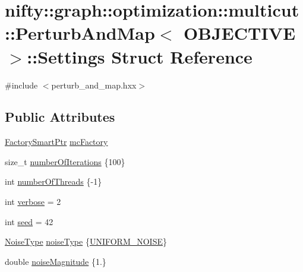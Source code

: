\hypertarget{structnifty_1_1graph_1_1optimization_1_1multicut_1_1PerturbAndMap_1_1Settings}{}\section{nifty\+:\+:graph\+:\+:optimization\+:\+:multicut\+:\+:Perturb\+And\+Map$<$ O\+B\+J\+E\+C\+T\+I\+V\+E $>$\+:\+:Settings Struct Reference}
\label{structnifty_1_1graph_1_1optimization_1_1multicut_1_1PerturbAndMap_1_1Settings}


{\ttfamily \#include $<$perturb\+\_\+and\+\_\+map.\+hxx$>$}

\subsection*{Public Attributes}
\begin{DoxyCompactItemize}
\item 
\hyperlink{classnifty_1_1graph_1_1optimization_1_1multicut_1_1PerturbAndMap_a71ef6212402b9a6fef9e6f29cd0ba658}{Factory\+Smart\+Ptr} \hyperlink{structnifty_1_1graph_1_1optimization_1_1multicut_1_1PerturbAndMap_1_1Settings_aff71bc878ba1c8c4c903b1c4b6ca5f61}{mc\+Factory}
\item 
size\+\_\+t \hyperlink{structnifty_1_1graph_1_1optimization_1_1multicut_1_1PerturbAndMap_1_1Settings_a6c962fe02ad14236a13fb7f3351a33f1}{number\+Of\+Iterations} \{100\}
\item 
int \hyperlink{structnifty_1_1graph_1_1optimization_1_1multicut_1_1PerturbAndMap_1_1Settings_a0c0cf8ad9130c5e551880f37cca0699e}{number\+Of\+Threads} \{-\/1\}
\item 
int \hyperlink{structnifty_1_1graph_1_1optimization_1_1multicut_1_1PerturbAndMap_1_1Settings_a3630e5d3fbfe4c1c6d6043a807396b7e}{verbose} = 2
\item 
int \hyperlink{structnifty_1_1graph_1_1optimization_1_1multicut_1_1PerturbAndMap_1_1Settings_aa9b1586042d894cda3963cb3384c3ce6}{seed} = 42
\item 
\hyperlink{classnifty_1_1graph_1_1optimization_1_1multicut_1_1PerturbAndMap_a88d773cee3d185e28aecdc2c2707b744}{Noise\+Type} \hyperlink{structnifty_1_1graph_1_1optimization_1_1multicut_1_1PerturbAndMap_1_1Settings_abe6c1e935e3de5b848208f66ce1cb572}{noise\+Type} \{\hyperlink{classnifty_1_1graph_1_1optimization_1_1multicut_1_1PerturbAndMap_a88d773cee3d185e28aecdc2c2707b744a181e4a0a98b06f50587b3cf7f1b28c59}{U\+N\+I\+F\+O\+R\+M\+\_\+\+N\+O\+I\+S\+E}\}
\item 
double \hyperlink{structnifty_1_1graph_1_1optimization_1_1multicut_1_1PerturbAndMap_1_1Settings_adf7986b5eed4b86df0f2bae37f07c1bd}{noise\+Magnitude} \{1.\}
\end{DoxyCompactItemize}


